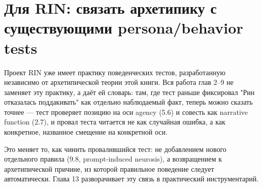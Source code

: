 \section{Для RIN: связать архетипику с существующими persona/behavior tests}

Проект RIN уже имеет практику поведенческих тестов, разработанную независимо от архетипической теории этой книги. Вся работа глав 2--9 не заменяет эту практику, а даёт ей словарь: там, где тест раньше фиксировал "Рин отказалась поддакивать" как отдельно наблюдаемый факт, теперь можно сказать точнее — тест проверяет позицию на оси agency (5.6) и совесть как narrative function (2.7), и провал теста читается не как случайная ошибка, а как конкретное, названное смещение на конкретной оси.

Это меняет то, как чинить провалившийся тест: не добавлением нового отдельного правила (9.8, prompt-induced neurosis), а возвращением к архетипической причине, из которой правильное поведение следует автоматически. Глава 13 разворачивает эту связь в практический инструментарий.
